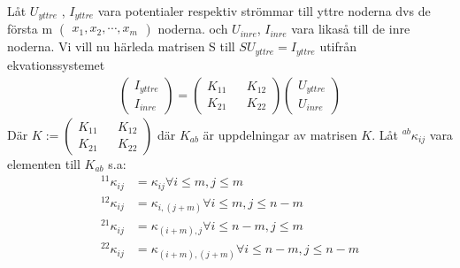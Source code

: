 \documentclass{assignment}
\begin{document}
Låt $U_{yttre}$ , $I_{yttre}$ vara potentialer respektiv strömmar till yttre noderna dvs de första m $\begin{pmatrix} x_1, x_2, \cdots, x_m \end{pmatrix}$ noderna.
och $U_{inre}$, $I_{inre}$ vara likaså till de inre noderna.
Vi vill nu härleda matrisen S till $SU_{yttre} = I_{yttre}$
utifrån ekvationssystemet
\begin{align}
    \begin{pmatrix}
        I_{yttre}
        \\ I_{inre} 
    \end{pmatrix}
    = 
    \begin{pmatrix}
        K_{11} && K_{12}
        \\ K_{21} && K_{22}
    \end{pmatrix}
    \begin{pmatrix}
        U_{yttre}
        \\ U_{inre}
    \end{pmatrix}
\end{align}
Där $K := \begin{pmatrix}
    K_{11} && K_{12}
    \\ K_{21} && K_{22}
\end{pmatrix}$
där $K_{ab}$ är uppdelningar av matrisen $K$. Låt $^{ab}\kappa_{ij}$ vara elementen till $K_{ab}$ s.a: 
\begin{align}
    ^{11}\kappa_{ij} & = \kappa_{ij} \forall i\leq m, j\leq m \label{K11:element}
    \\ ^{12}\kappa_{ij} & = \kappa_{i,(j+m)} \forall i \leq m, j \leq n-m \label{K12:element}
    \\ ^{21}\kappa_{ij} & = \kappa_{(i+m),j} \forall i \leq n-m, j\leq m \label{K21:element}
    \\ ^{22}\kappa_{ij} & = \kappa_{(i+m),(j+m)}\forall i \leq n-m, j\leq n-m \label{K22:element}
\end{align}
\end{document}
